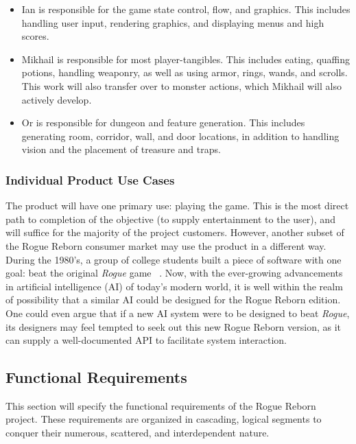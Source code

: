 \documentclass[12pt, titlepage]{article}
\begin{document}
		\begin{itemize}
			\item Ian is responsible for the game state control, flow, and graphics.  This includes handling user input, rendering graphics, and displaying menus and high scores.\\

			\item Mikhail is responsible for most player-tangibles.  This includes eating, quaffing potions, handling weaponry, as well as using armor, rings, wands, and scrolls.  This work will also transfer over to monster actions, which Mikhail will also actively develop.\\

			\item Or is responsible for dungeon and feature generation.  This includes generating room, corridor, wall, and door locations, in addition to handling vision and the placement of treasure and traps.
		\end{itemize}
		
		\subsubsection{Individual Product Use Cases}

		The product will have one primary use: playing the game.  This is the most direct path to completion of the objective (to supply entertainment to the user), and will suffice for the majority of the project customers.  However, another subset of the Rogue Reborn consumer market may use the product in a different way.  During the 1980's, a group of college students built a piece of software with one goal: beat the original \textit{Rogue} game ~\citep{RogueAI}.  Now, with the ever-growing advancements in artificial intelligence (AI) of today's modern world, it is well within the realm of possibility that a similar AI could be designed for the Rogue Reborn edition.  One could even argue that if a new AI system were to be designed to beat \textit{Rogue}, its designers may feel tempted to seek out this new Rogue Reborn version, as it can supply a well-documented API to facilitate system interaction.

	\subsection{Functional Requirements}

	This section will specify the functional requirements of the Rogue Reborn project.  These requirements are organized in cascading, logical segments to conquer their numerous, scattered, and interdependent nature.
\end{document}
